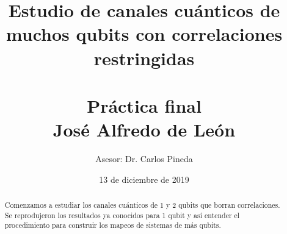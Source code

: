 \documentclass[11pt]{article}
\title{\huge{\textbf{Estudio de canales cuánticos de muchos qubits con correlaciones restringidas}}  \\
\textbf{\normalsize{\\ Práctica final \\ José Alfredo de León}}}
\author{\normalsize{Asesor: Dr. Carlos Pineda}}
\date{\footnotesize{13 de diciembre de 2019}}
\begin{document}
 
 
 
\maketitle

\begin{abstract}
	Comenzamos a estudiar los canales cuánticos de 1 y 2 qubits que borran correlaciones. Se reprodujeron los resultados ya conocidos para 1 qubit y así entender el procedimiento para construir los mapeos de sistemas de más qubits. 
\end{abstract}
\end{document}
